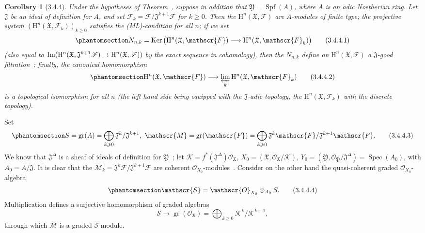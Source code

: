 \documentclass[oneside]{amsart}
\theoremstyle{ega-env-style}
\theoremstyle{ega-thm-env-style}
\newtheorem*{corollary}{Corollary}
\theoremstyle{ega-defn-env-style}
\def\mathcal{\mathscr}
\def\sh{\mathcal}                   %
\def\geq{\geqslant}                 %
\def\HH{\mathrm{H}}                 %
\def\gr{\operatorname{gr}}
\def\Ker{\operatorname{Ker}}
\def\Im{\operatorname{Im}}
\def\Spec{\operatorname{Spec}}
\def\Spf{\operatorname{Spf}}
\renewcommand{\to}{\mathchoice{\longrightarrow}{\rightarrow}{\rightarrow}{\rightarrow}}
\let\EGAOriginalLabel\label
\renewcommand{\label}[1]{\phantomsection\EGAOriginalLabel{#1}}
\begin{document}
\begin{corollary}[3.4.4]
\label{III.3.4.4}
Under the hypotheses of Theorem~, suppose in addition that $\mathfrak{Y}=\Spf(A)$, where $A$ is an adic Noetherian ring.
Let $\mathfrak{J}$ be an ideal of definition for $A$, and set $\sh{F}_k=\sh{F}/\mathfrak{J}^{k+1}\sh{F}$ for $k\geq 0$.
Then the $\HH^n(\mathfrak{X},\sh{F})$ are $A$-modules of finite type; the projective system $(\HH^n(\mathfrak{X},\sh{F}_k))_{k\geq 0}$ satisfies the \emph{(ML)}-condition for all $n$; if we set
\[
\label{III.3.4.4.1}
  N_{n,k}=\Ker\big(\HH^n(\mathfrak{X},\sh{F})\to\HH^n(\mathfrak{X},\sh{F}_k)\big)
  \tag{3.4.4.1}
\]
(also equal to $\Im(\HH^n(\mathfrak{X},\mathfrak{J}^{k+1}\sh{F})\to\HH^n(\mathfrak{X},\sh{F}))$ by the exact sequence in cohomology), then the $N_{n,k}$ define on $\HH^n(\mathfrak{X},\sh{F})$ a $\mathfrak{J}$-good filtration~; finally, the canonical homomorphism
\[
\label{III.3.4.4.2}
  \HH^n(\mathfrak{X},\sh{F})\to\varprojlim_k\HH^n(\mathfrak{X},\sh{F}_k)
  \tag{3.4.4.2}
\]
is a topological isomorphism for all $n$ (the left hand side being equipped with the $\mathfrak{J}$-adic topology, the $\HH^n(\mathfrak{X},\sh{F}_k)$ with the discrete topology).
\end{corollary}

Set
\[
\label{III.3.4.4.3}
  S=\gr(A)=\bigoplus_{k\geq 0}\mathfrak{J}^k/\mathfrak{J}^{k+1},\ \sh{M}=\gr(\sh{F})=\bigoplus_{k\geq 0}\mathfrak{J}^k\sh{F}/\mathfrak{J}^{k+1}\sh{F}. \tag{3.4.4.3}
\]
We know that $\mathfrak{J}^\Delta$ is a sheaf of ideals of definition for $\mathfrak{Y}$~; let $\sh{K}=f^*(\mathfrak{J}^\Delta)\sh{O}_\mathfrak{X}$, $X_0=(\mathfrak{X},\sh{O}_\mathfrak{X}/\sh{K})$, $Y_0=(\mathfrak{Y},\sh{O}_\mathfrak{Y}/\mathfrak{J}^\Delta)=\Spec(A_0)$, with $A_0=A/\mathfrak{J}$.
It is clear that the $\sh{M}_k=\mathfrak{J}^k\sh{F}/\mathfrak{J}^{k+1}\sh{F}$ are coherent $\sh{O}_{X_0}$-modules~.
Consider on the other hand the quasi-coherent graded $\sh{O}_{X_0}$-algebra
\[
\label{III.3.4.4.4}
  \sh{S}=\sh{O}_{X_0}\otimes_{A_0}S.
  \tag{3.4.4.4}
\]
Multiplication defines a surjective homomorphism of graded algebras
\[
  \sh{S}\longrightarrow\gr(\sh{O}_\mathfrak{X})
  =\bigoplus_{k\geq 0}\sh{K}^k/\sh{K}^{k+1},
\]
through which $\sh{M}$ is a graded $\sh{S}$-module.
\end{document}
